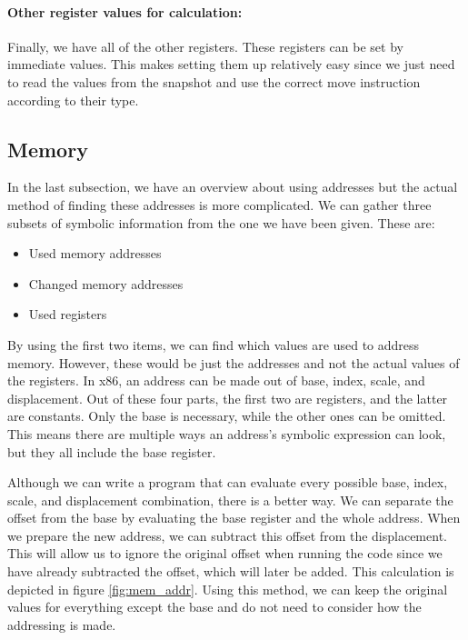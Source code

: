 \paragraph{Other register values for calculation:}
Finally, we have all of the other registers.
These registers can be set by immediate values.
This makes setting them up relatively easy since we just need to read the values from the snapshot and use the correct move instruction according to their type. 

\subsection{Memory}
In the last subsection, we have an overview about using addresses but the actual method of finding these addresses is more complicated.
We can gather three subsets of symbolic information from the one we have been given. These are:
\begin{itemize}
    \item Used memory addresses
    \item Changed memory addresses
    \item Used registers
\end{itemize}

By using the first two items, we can find which values are used to address memory.
However, these would be just the addresses and not the actual values of the registers.
In x86, an address can be made out of base, index, scale, and displacement.
Out of these four parts, the first two are registers, and the latter are constants.
Only the base is necessary, while the other ones can be omitted.
This means there are multiple ways an address's symbolic expression can look, but they all include the base register.

Although we can write a program that can evaluate every possible base, index, scale, and displacement combination, there is a better way.
We can separate the offset from the base by evaluating the base register and the whole address.
When we prepare the new address, we can subtract this offset from the displacement.
This will allow us to ignore the original offset when running the code since we have already subtracted the offset, which will later be added.
This calculation is depicted in figure \ref{fig:mem_addr}.
Using this method, we can keep the original values for everything except the base and do not need to consider how the addressing is made.

